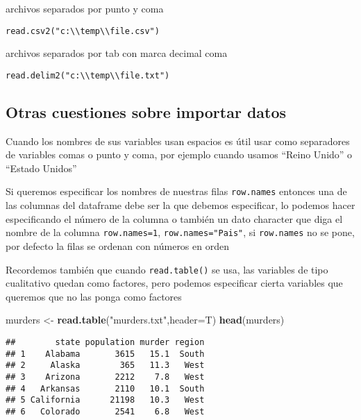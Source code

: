 \documentclass[]{article}
\newenvironment{Shaded}{\begin{snugshade}}{\end{snugshade}}
\newcommand{\KeywordTok}[1]{\textcolor[rgb]{0.13,0.29,0.53}{\textbf{#1}}}
\newcommand{\DataTypeTok}[1]{\textcolor[rgb]{0.13,0.29,0.53}{#1}}
\newcommand{\StringTok}[1]{\textcolor[rgb]{0.31,0.60,0.02}{#1}}
\newcommand{\NormalTok}[1]{#1}
\begin{document}
archivos separados por punto y coma

\begin{verbatim}
read.csv2("c:\\temp\\file.csv")
\end{verbatim}

archivos separados por tab con marca decimal coma

\begin{verbatim}
read.delim2("c:\\temp\\file.txt")
\end{verbatim}

\subsection{Otras cuestiones sobre importar
datos}\label{otras-cuestiones-sobre-importar-datos}

Cuando los nombres de sus variables usan espacios es útil usar como
separadores de variables comas o punto y coma, por ejemplo cuando usamos
``Reino Unido'' o ``Estado Unidos''

Si queremos especificar los nombres de nuestras filas \texttt{row.names}
entonces una de las columnas del dataframe debe ser la que debemos
especificar, lo podemos hacer especificando el número de la columna o
también un dato character que diga el nombre de la columna
\texttt{row.names=1}, \texttt{row.names="Pais"}, si \texttt{row.names}
no se pone, por defecto la filas se ordenan con números en orden

Recordemos también que cuando \texttt{read.table()} se usa, las
variables de tipo cualitativo quedan como factores, pero podemos
especificar cierta variables que queremos que no las ponga como factores

\begin{Shaded}
\begin{Highlighting}[]
\NormalTok{murders <-}\StringTok{ }\KeywordTok{read.table}\NormalTok{(}\StringTok{"murders.txt"}\NormalTok{,}\DataTypeTok{header=}\NormalTok{T)}
\KeywordTok{head}\NormalTok{(murders)}
\end{Highlighting}
\end{Shaded}

\begin{verbatim}
##        state population murder region
## 1    Alabama       3615   15.1  South
## 2     Alaska        365   11.3   West
## 3    Arizona       2212    7.8   West
## 4   Arkansas       2110   10.1  South
## 5 California      21198   10.3   West
## 6   Colorado       2541    6.8   West
\end{verbatim}
\end{document}
